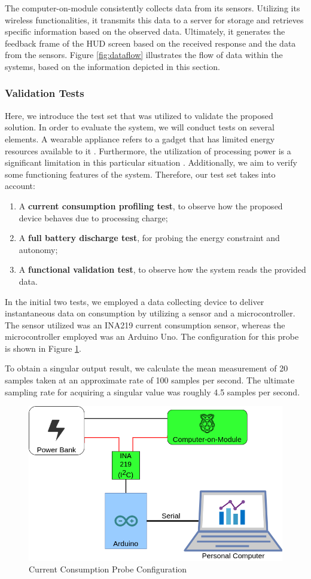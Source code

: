 The computer-on-module consistently collects data from its sensors. Utilizing its wireless functionalities, it transmits this data to a server for storage and retrieves specific information based on the observed data. Ultimately, it generates the feedback frame of the HUD screen based on the received response and the data from the sensors. Figure \ref{fig:dataflow} illustrates the flow of data within the systems, based on the information depicted in this section.

\subsubsection{Validation Tests}

Here, we introduce the test set that was utilized to validate the proposed solution. In order to evaluate the system, we will conduct tests on several elements. A wearable appliance refers to a gadget that has limited energy resources available to it \cite{hong2019wearable,gia2018energy}. Furthermore, the utilization of processing power is a significant limitation in this particular situation \cite{soros2015fast}. Additionally, we aim to verify some functioning features of the system. Therefore, our test set takes into account:

\begin{enumerate}
    \item A \textbf{current consumption profiling test}, to observe how the proposed device behaves due to processing charge;
    \item A \textbf{full battery discharge test}, for probing the energy constraint and autonomy;
    \item A \textbf{functional validation test}, to observe how the system reads the provided data.
\end{enumerate}

In the initial two tests, we employed a data collecting device to deliver instantaneous data on consumption by utilizing a sensor and a microcontroller. The sensor utilized was an INA219 current consumption sensor, whereas the microcontroller employed was an Arduino Uno. The configuration for this probe is shown in Figure \ref{fig:probe-config}.

To obtain a singular output result, we calculate the mean measurement of 20 samples taken at an approximate rate of 100 samples per second. The ultimate sampling rate for acquiring a singular value was roughly 4.5 samples per second.

\begin{figure}[h!]
    \centering
    \includegraphics[width = .6\linewidth]{Figures/test-schematics.png}
    \caption{Current Consumption Probe Configuration}
    \label{fig:probe-config}
\end{figure}

